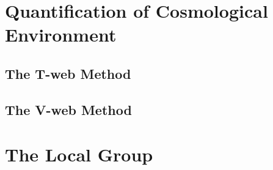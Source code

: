 \section{Quantification of Cosmological Environment}
\label{sec:QuantificationOfCosmologicalEnvironment}


	\subsection{The T-web Method}
	\label{subsec:TheT-webMethod}


	\subsection{The V-web Method}
	\label{subsec:TheV-webMethod}






\section{The Local Group}
\label{sec:TheLocalGroup}
